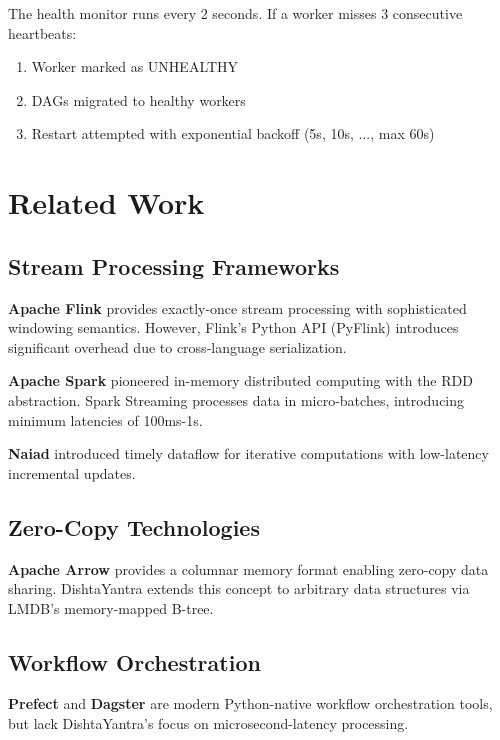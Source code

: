 \documentclass[11pt,a4paper]{article}
\begin{document}
The health monitor runs every 2 seconds. If a worker misses 3 consecutive heartbeats:
\begin{enumerate}
    \item Worker marked as UNHEALTHY
    \item DAGs migrated to healthy workers
    \item Restart attempted with exponential backoff (5s, 10s, ..., max 60s)
\end{enumerate}

\section{Related Work}

\subsection{Stream Processing Frameworks}

\textbf{Apache Flink} \cite{carbone2015flink} provides exactly-once stream processing with sophisticated windowing semantics. However, Flink's Python API (PyFlink) introduces significant overhead due to cross-language serialization.

\textbf{Apache Spark} \cite{zaharia2016spark} pioneered in-memory distributed computing with the RDD abstraction. Spark Streaming processes data in micro-batches, introducing minimum latencies of 100ms-1s.

\textbf{Naiad} \cite{murray2013naiad} introduced timely dataflow for iterative computations with low-latency incremental updates.

\subsection{Zero-Copy Technologies}

\textbf{Apache Arrow} \cite{arrow2016} provides a columnar memory format enabling zero-copy data sharing. DishtaYantra extends this concept to arbitrary data structures via LMDB's memory-mapped B-tree.

\subsection{Workflow Orchestration}

\textbf{Prefect} \cite{prefect2018} and \textbf{Dagster} \cite{dagster2019} are modern Python-native workflow orchestration tools, but lack DishtaYantra's focus on microsecond-latency processing.
\end{document}
